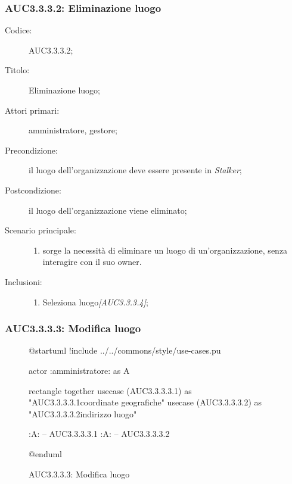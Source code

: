 \documentclass[../../../analisi-dei-requisiti.tex]{subfiles}
\begin{document}
\subsubsection{AUC3.3.3.2: Eliminazione luogo}%
\label{subs:AUC3.3.3.2}
\begin{description}
  \item[Codice:] AUC3.3.3.2;
  \item[Titolo:] Eliminazione luogo;
  \item[Attori primari:] amministratore, gestore;
  \item[Precondizione:] il luogo dell'organizzazione deve essere presente in \emph{Stalker};
  \item[Postcondizione:] il luogo dell'organizzazione viene eliminato;
  \item[Scenario principale:]
  \begin{enumerate}
    \item sorge la necessità di eliminare un luogo di un'organizzazione, senza interagire con il suo owner.
  \end{enumerate}
  \item[Inclusioni:]
  \begin{enumerate}
    \item Seleziona luogo\emph{[AUC3.3.3.4]};
  \end{enumerate}
\end{description}

\subsubsection{AUC3.3.3.3: Modifica luogo}%
\label{subs:AUC3.3.3.3}

\begin{figure}[H]
  \centering
  \begin{plantuml}
  @startuml
  !include ../../commons/style/use-cases.pu

  actor :amministratore: as A

  rectangle {
    together {
      usecase (AUC3.3.3.3.1) as "AUC3.3.3.3.1\nModifica coordinate geografiche"
      usecase (AUC3.3.3.3.2) as "AUC3.3.3.3.2\nModifica indirizzo luogo"
    }
  }

  :A: -- AUC3.3.3.3.1
  :A: -- AUC3.3.3.3.2

  @enduml
  \end{plantuml}
  \caption{AUC3.3.3.3: Modifica luogo}%
  \label{fig:AUC3_3_3_3}
\end{figure}
\end{document}
